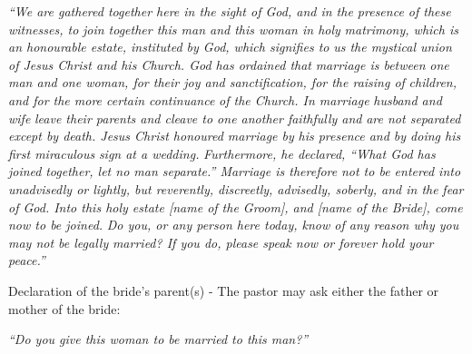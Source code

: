 \begin{outerlst}[left=0pt,labelsep=0pt]
\textit{{``We are gathered together here in the sight of God, and in the presence of these witnesses, to}}\textit{ join together this man and this woman in holy}\textit{ matrimony, which is an honourable estate, instituted by God}\textit{, which signifies to}\textit{ us the mystical union}\textit{ of Jesus Christ and his Church. God has ordained that}\textit{ marriage is between}\textit{ one man and one woman, for their joy and sanctification}\textit{, for the raising of}\textit{ children, and for the more certain continuance}\textit{ of the Church. In marriage}\textit{ husband and wife}\textit{ leave their parents and cleave to one another faithfully and}\textit{ are not separated except by death}\textit{. Jesus Christ honoured marriage by}\textit{ his presence and by doing his first miraculous}\textit{ sign at a wedding.}\textit{ Furthermore, he declared, ``What God has joined}\textit{ together, let no man separate}\textit{.'' Marriage is therefore}\textit{ not to be entered into unadvisedly or lightly}\textit{, but reverently, discreetly, advisedly, soberly, and in the }\textit{fear of God. Into this holy estate [name of the Groom], and [name of the Bride], come now to be joined.}  \textit{Do you, or any person here today, know of any reason why you may not be legally}\textit{ married? If you do, please speak now or forever hold your peace.''}  

\begin{innerlst}[resume*]
      \item Declaration of the bride's parent(s) - The pastor may ask either the father or mother of the bride: 
\end{innerlst}
\textit{{``Do you give this woman to be married to this man?''}}  


\end{outerlst}
